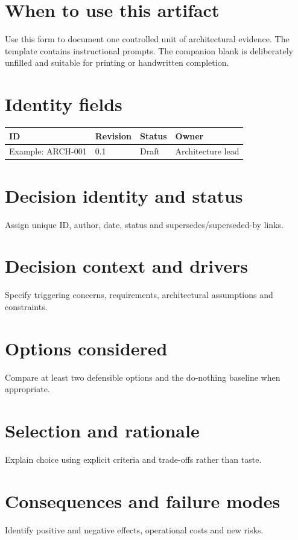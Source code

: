 \documentclass[10pt,letterpaper]{article}
\begin{document}
\DocProvenance
\section{When to use this artifact}
Use this form to document one controlled unit of architectural evidence. The template contains instructional prompts. The companion blank is deliberately unfilled and suitable for printing or handwritten completion.

\section{Identity fields}
\small
\begin{tabularx}{\linewidth}{@{}YYYY@{}}
\toprule
\textbf{ID} & \textbf{Revision} & \textbf{Status} & \textbf{Owner} \\
\midrule
Example: ARCH-001 & 0.1 & Draft & Architecture lead \\
\bottomrule
\end{tabularx}
\normalsize
\section{Decision identity and status}
Assign unique ID, author, date, status and supersedes/superseded-by links.

\section{Decision context and drivers}
Specify triggering concerns, requirements, architectural assumptions and constraints.

\section{Options considered}
Compare at least two defensible options and the do-nothing baseline when appropriate.

\section{Selection and rationale}
Explain choice using explicit criteria and trade-offs rather than taste.

\section{Consequences and failure modes}
Identify positive and negative effects, operational costs and new risks.
\end{document}
